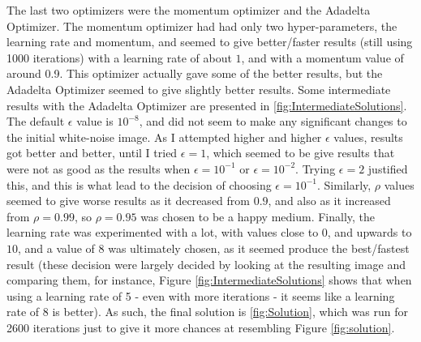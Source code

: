 \documentclass[12pt]{article}
\begin{document}
The last two optimizers were the momentum optimizer and the Adadelta Optimizer. The momentum optimizer had had only two hyper-parameters, the learning rate and momentum, and seemed to give better/faster results (still using 1000 iterations) with a learning rate of about $1$, and with a momentum value of around 0.9. This optimizer actually gave some of the better results, but the Adadelta Optimizer seemed to give slightly better results. Some intermediate results with the Adadelta Optimizer are presented in \ref{fig:IntermediateSolutions}. The default $\epsilon$ value is $10^{-8}$, and did not seem to make any significant changes to the initial white-noise image. As I attempted higher and higher $\epsilon$ values, results got better and better, until I tried $\epsilon = 1$, which seemed to be give results that were not as good as the results when $\epsilon = 10^{-1}$ or $\epsilon = 10^{-2}$. Trying $\epsilon = 2$ justified this, and this is what lead to the decision of choosing $\epsilon = 10^{-1}$. Similarly, $\rho$ values seemed to give worse results as it decreased from $0.9$, and also as it increased from $\rho = 0.99$, so $\rho = 0.95$ was chosen to be a happy medium. Finally, the learning rate was experimented with a lot, with values close to $0$, and upwards to $10$, and a value of $8$ was ultimately chosen, as it seemed produce the best/fastest result (these decision were largely decided by looking at the resulting image and comparing them, for instance, Figure \ref{fig:IntermediateSolutions} shows that when using a learning rate of 5 - even with more iterations - it seems like a learning rate of 8 is better). As such, the final solution is \ref{fig:Solution}, which was run for 2600 iterations just to give it more chances at resembling Figure \ref{fig:solution}.
\end{document}
